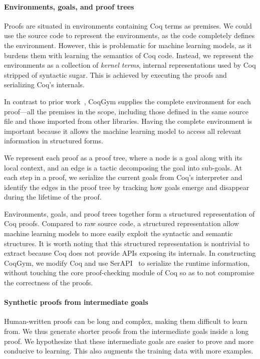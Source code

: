 \documentclass{article}
\newcommand{\smallsec}[1]{\vspace{-3mm} \paragraph{#1}}
\newcommand{\datasetname}{CoqGym}
\begin{document}
\smallsec{Environments, goals, and proof trees}
Proofs are situated in environments containing Coq terms as premises.
We could use the source code to represent the environments, 
as the code completely defines the environment.
However, this is problematic for machine learning models, 
as it burdens them with learning the semantics of Coq code.
Instead, we represent the environments as a collection of \emph{kernel terms}, internal representations used by Coq stripped of syntactic sugar.
This is achieved by executing the proofs and serializing Coq's internals.


In contrast to prior work~\citep{huang2018gamepad}, {\datasetname } supplies the complete environment for each proof---all the premises in the scope, including those defined in the same source file and those imported from other libraries.
Having the complete environment is important because it allows the machine learning model to access all relevant information in structured forms. 



We represent each proof as a proof tree, where a node is a goal along with its local context, and an edge is a tactic decomposing the goal into sub-goals.
At each step in a proof, we serialize the current goals from Coq's interpreter and identify the edges in the proof tree by tracking how goals emerge and disappear during the lifetime of the proof.



Environments, goals, and proof trees together form a structured representation of Coq proofs. Compared to raw source code, a structured representation allow machine learning models to more easily exploit the syntactic and semantic structures. It is worth noting that this structured representation is nontrivial to extract because Coq does not provide APIs exposing its internals.
In constructing \datasetname, we modify Coq and use SerAPI~\citep{GallegoArias2016SerAPI} to serialize the runtime information, without touching the core proof-checking module of Coq so as to not compromise the correctness of the proofs.




\smallsec{Synthetic proofs from intermediate goals}
Human-written proofs can be long and complex, making them difficult to learn from. We thus generate shorter proofs from the intermediate goals inside a long proof. We hypothesize that these intermediate goals are easier to prove and more conducive to learning. This also augments the training data with more examples. 
\end{document}
